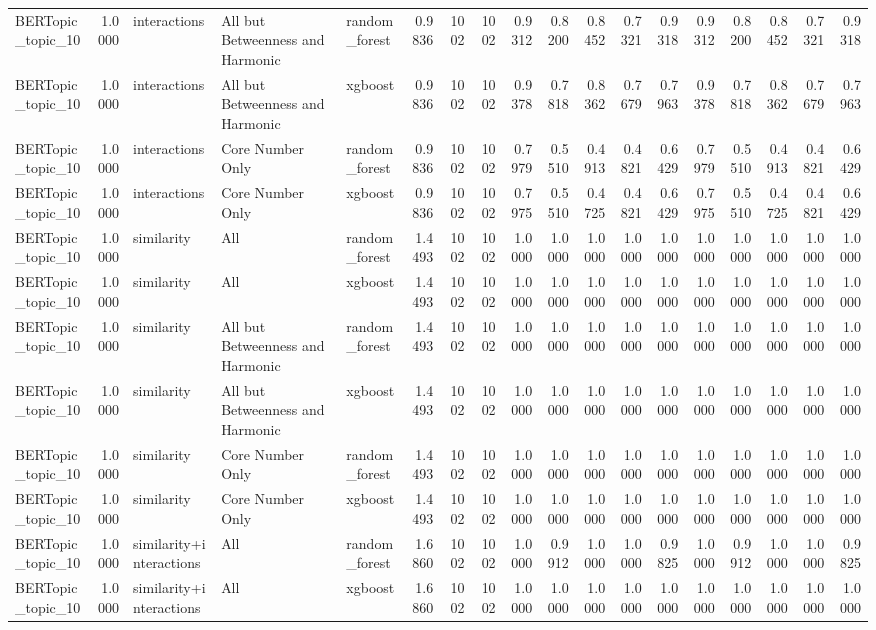 \begin{tabular}{lrlllrrrrrrrrrrrrr}
BERTopic_topic_10 & 1.0000 & interactions & All but Betweenness and Harmonic & random_forest & 0.9836 & 1002 & 1002 & 0.9312 & 0.8200 & 0.8452 & 0.7321 & 0.9318 & 0.9312 & 0.8200 & 0.8452 & 0.7321 & 0.9318 \\
BERTopic_topic_10 & 1.0000 & interactions & All but Betweenness and Harmonic & xgboost & 0.9836 & 1002 & 1002 & 0.9378 & 0.7818 & 0.8362 & 0.7679 & 0.7963 & 0.9378 & 0.7818 & 0.8362 & 0.7679 & 0.7963 \\
BERTopic_topic_10 & 1.0000 & interactions & Core Number Only & random_forest & 0.9836 & 1002 & 1002 & 0.7979 & 0.5510 & 0.4913 & 0.4821 & 0.6429 & 0.7979 & 0.5510 & 0.4913 & 0.4821 & 0.6429 \\
BERTopic_topic_10 & 1.0000 & interactions & Core Number Only & xgboost & 0.9836 & 1002 & 1002 & 0.7975 & 0.5510 & 0.4725 & 0.4821 & 0.6429 & 0.7975 & 0.5510 & 0.4725 & 0.4821 & 0.6429 \\
BERTopic_topic_10 & 1.0000 & similarity & All & random_forest & 1.4493 & 1002 & 1002 & 1.0000 & 1.0000 & 1.0000 & 1.0000 & 1.0000 & 1.0000 & 1.0000 & 1.0000 & 1.0000 & 1.0000 \\
BERTopic_topic_10 & 1.0000 & similarity & All & xgboost & 1.4493 & 1002 & 1002 & 1.0000 & 1.0000 & 1.0000 & 1.0000 & 1.0000 & 1.0000 & 1.0000 & 1.0000 & 1.0000 & 1.0000 \\
BERTopic_topic_10 & 1.0000 & similarity & All but Betweenness and Harmonic & random_forest & 1.4493 & 1002 & 1002 & 1.0000 & 1.0000 & 1.0000 & 1.0000 & 1.0000 & 1.0000 & 1.0000 & 1.0000 & 1.0000 & 1.0000 \\
BERTopic_topic_10 & 1.0000 & similarity & All but Betweenness and Harmonic & xgboost & 1.4493 & 1002 & 1002 & 1.0000 & 1.0000 & 1.0000 & 1.0000 & 1.0000 & 1.0000 & 1.0000 & 1.0000 & 1.0000 & 1.0000 \\
BERTopic_topic_10 & 1.0000 & similarity & Core Number Only & random_forest & 1.4493 & 1002 & 1002 & 1.0000 & 1.0000 & 1.0000 & 1.0000 & 1.0000 & 1.0000 & 1.0000 & 1.0000 & 1.0000 & 1.0000 \\
BERTopic_topic_10 & 1.0000 & similarity & Core Number Only & xgboost & 1.4493 & 1002 & 1002 & 1.0000 & 1.0000 & 1.0000 & 1.0000 & 1.0000 & 1.0000 & 1.0000 & 1.0000 & 1.0000 & 1.0000 \\
BERTopic_topic_10 & 1.0000 & similarity+interactions & All & random_forest & 1.6860 & 1002 & 1002 & 1.0000 & 0.9912 & 1.0000 & 1.0000 & 0.9825 & 1.0000 & 0.9912 & 1.0000 & 1.0000 & 0.9825 \\
BERTopic_topic_10 & 1.0000 & similarity+interactions & All & xgboost & 1.6860 & 1002 & 1002 & 1.0000 & 1.0000 & 1.0000 & 1.0000 & 1.0000 & 1.0000 & 1.0000 & 1.0000 & 1.0000 & 1.0000 \\

\end{tabular}
